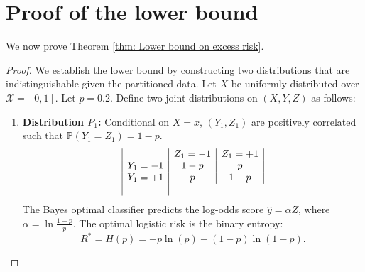 \section{Proof of the lower bound}

We now prove Theorem \ref{thm: Lower bound on excess risk}.

\begin{proof}
    We establish the lower bound by constructing two distributions that are indistinguishable given the partitioned data. Let $X$ be uniformly distributed over $\mathcal{X}=[0,1]$. Let $p = 0.2$. Define two joint distributions on $(X,Y,Z)$ as follows:

    \begin{enumerate}
        \item[(I)] \textbf{Distribution $P_1$:} Conditional on $X=x$, $(Y_1, Z_1)$ are positively correlated such that $\mathbb{P}(Y_1 = Z_1) = 1-p$.
        \begin{equation*}
            \begin{array}{|c|c|c|}
                \hline
                & Z_1=-1 & Z_1=+1 \\
                \hline
                Y_1=-1 & 1-p & p \\
                \hline
                Y_1=+1 & p & 1-p \\
                \hline
            \end{array}
        \end{equation*}
        The Bayes optimal classifier predicts the log-odds score $\hat{y} = \alpha Z$, where $\alpha = \ln \frac{1-p}{p}$. The optimal logistic risk is the binary entropy:
        \begin{equation*}
            R^* = H(p) = -p\ln(p) - (1-p)\ln(1-p).
        \end{equation*}


\end{enumerate}
\end{proof}
